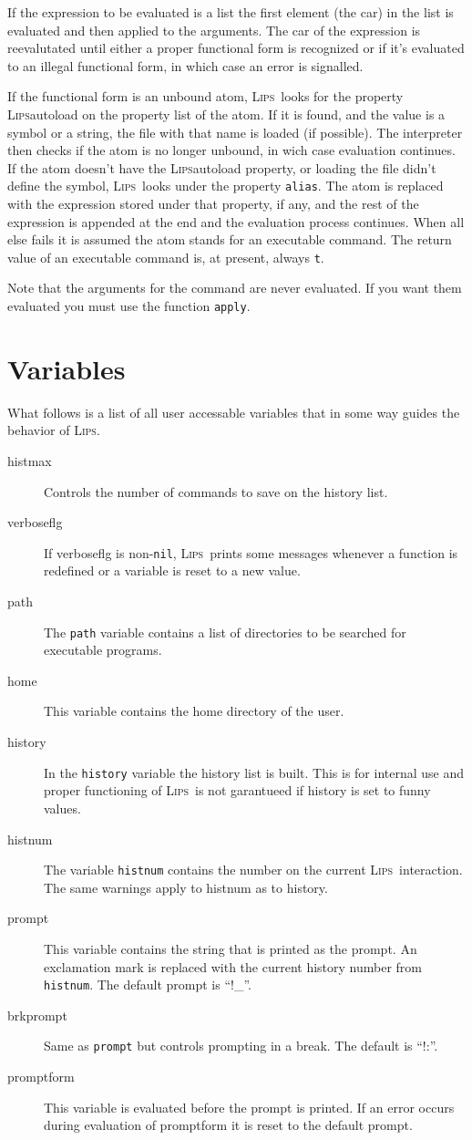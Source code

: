 \documentclass[a4paper]{article}
\newcommand{\lips}{\textsc{Lips}}
\newcommand{\lisp}[1]{\texttt{#1}}
\newcommand{\T}{\lisp{t}}
\newcommand{\NIL}{\lisp{nil}}
\begin{document}
If the expression to be evaluated is a list the first element (the
car) in the list is evaluated and then applied to the arguments.  The
car of the expression is reevalutated until either a proper functional
form is recognized or if it's evaluated to an illegal functional form,
in which case an error is signalled.

If the functional form is an unbound atom, \lips\ looks for the
property \lips{autoload} on the property list of the atom.  If it is
found, and the value is a symbol or a string, the file with that name
is loaded (if possible).  The interpreter then checks if the atom is
no longer unbound, in wich case evaluation continues.  If the atom
doesn't have the \lips{autoload} property, or loading the file didn't
define the symbol, \lips\ looks under the property \lisp{alias}.  The
atom is replaced with the expression stored under that property, if
any, and the rest of the expression is appended at the end and the
evaluation process continues.  When all else fails it is assumed the
atom stands for an executable command.  The return value of an
executable command is, at present, always \T.

Note that the arguments for the command are never evaluated.  If you
want them evaluated you must use the function \lisp{apply}.

\section{Variables}
What follows is a list of all user accessable variables that in some
way guides the behavior of \lips.
\begin{description}
\item[histmax] Controls the number of commands to save on the history
  list.
\item[verboseflg] If verboseflg is non-\NIL, \lips\ prints some
  messages whenever a function is redefined or a variable is reset to
  a new value.
\item[path] The \lisp{path} variable contains a list of directories to
  be searched for executable programs.
\item[home] This variable contains the home directory of the user.
\item[history] In the \lisp{history} variable the history list is
  built.  This is for internal use and proper functioning of \lips\ is
  not garantueed if history is set to funny values.
\item[histnum] The variable \lisp{histnum} contains the number on the
  current \lips\ interaction.  The same warnings apply to histnum as
  to history.
\item[prompt] This variable contains the string that is printed as the
  prompt.  An exclamation mark is replaced with the current history
  number from \lisp{histnum}.  The default prompt is ``!\_''.
\item[brkprompt] Same as \lisp{prompt} but controls prompting in a break.
  The default is ``!:''.
\item[promptform] This variable is evaluated before the prompt is
  printed.  If an error occurs during evaluation of promptform it is
  reset to the default prompt.
\end{description}
\end{document}
